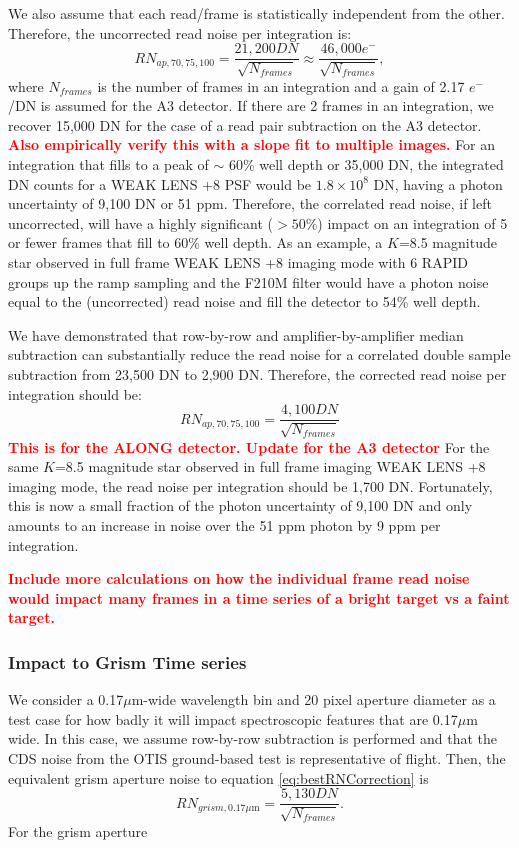 \documentclass{aastex62}
\begin{document}
We also assume that each read/frame is statistically independent from the other.
Therefore, the uncorrected read noise per integration is:
\begin{equation}
RN_{ap,70,75,100} = \frac{21,200 DN}{ \sqrt{N_{frames}}} \approx \frac{46,000 e^-}{ \sqrt{N_{frames}}},
\end{equation}
where $N_{frames}$ is the number of frames in an integration and a gain of 2.17 $e^-$/DN is assumed for the A3 detector.
If there are 2 frames in an integration, we recover 15,000 DN for the case of a read pair subtraction on the A3 detector.
\textcolor{red}{\bf Also empirically verify this with a slope fit to multiple images.}
For an integration that fills to a peak of $\sim$ 60\% well depth or 35,000 DN, the integrated DN counts for a WEAK LENS +8 PSF would be $1.8 \times10^8$ DN, having a photon uncertainty of 9,100 DN or 51 ppm.
Therefore, the correlated read noise, if left uncorrected, will have a highly significant ($>50\%$) impact on an integration of 5 or fewer frames that fill to 60\% well depth.
As an example, a $K$=8.5 magnitude star observed in full frame WEAK LENS +8 imaging mode with 6 RAPID groups up the ramp sampling and the F210M filter would have a photon noise equal to the (uncorrected) read noise and fill the detector to 54\% well depth.

We have demonstrated that row-by-row and amplifier-by-amplifier median subtraction can substantially reduce the read noise for a correlated double sample subtraction from 23,500 DN to 2,900 DN.
Therefore, the corrected read noise per integration should be:
\begin{equation}\label{eq:bestRNCorrection}
RN_{ap,70,75,100} = \frac{4,100 DN}{ \sqrt{N_{frames}}}
\end{equation}
\textcolor{red}{\bf This is for the ALONG detector.
Update for the A3 detector}
For the same $K$=8.5 magnitude star observed in full frame imaging WEAK LENS +8 imaging mode, the read noise per integration should be 1,700 DN.
Fortunately, this is now a small fraction of the photon uncertainty of 9,100 DN and only amounts to an increase in noise over the 51 ppm photon by 9 ppm per integration.


\textcolor{red}{\bf Include more calculations on how the individual frame read noise would impact many frames in a time series of a bright target vs a faint target.}

\subsubsection{Impact to Grism Time series}
We consider a 0.17$\mu$m-wide wavelength bin and 20 pixel aperture diameter as a test case for how badly it will impact spectroscopic features that are 0.17$\mu$m wide.
In this case, we assume row-by-row subtraction is performed and that the CDS noise from the OTIS ground-based test is representative of flight.
Then, the equivalent grism aperture noise to equation \ref{eq:bestRNCorrection} is
\begin{equation}
RN_{grism,0.17\mu\mathrm{m}} = \frac{5,130 DN}{ \sqrt{N_{frames}}}.
\end{equation}
For the grism aperture
\end{document}
